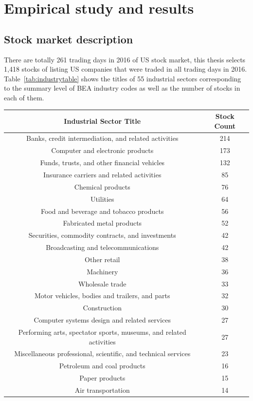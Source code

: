\chapter{Empirical study and results}
\label{cpt:result}
\section{Stock market description}
There are totally 261 trading days in 2016 of US stock market, this thesis selects 1,418 stocks of listing US companies that were traded in all trading days in 2016. Table~\ref{tab:industrytable} shows the titles of 55 industrial sectors corresponding to the summary level of BEA industry codes as well as the number of stocks in each of them.
\begin{longtable}{c|c} 
	\centering
	\textbf{Industrial Sector Title} & \textbf{Stock Count}  \\ \hline
	Banks, credit intermediation, and related activities & 214 \\ 
	Computer and electronic products & 173 \\
	Funds, trusts, and other financial vehicles	& 132\\
	Insurance carriers and related activities & 85 \\
	Chemical products & 76 \\
	Utilities & 64 \\
	Food and beverage and tobacco products	& 56 \\
	Fabricated metal products & 52 \\
	Securities, commodity contracts, and investments & 42 \\
	Broadcasting and telecommunications	& 42 \\
	Other retail & 38 \\
	Machinery&	36 \\
	Wholesale trade & 33 \\
	Motor vehicles, bodies and trailers, and parts & 32 \\
	Construction & 30 \\
	Computer systems design and related services & 27 \\
	Performing arts, spectator sports, museums, and related activities & 27 \\
	Miscellaneous professional, scientific, and technical services & 23 \\
	Petroleum and coal products & 16 \\
	Paper products & 15 \\
	Air transportation & 14 \\

\end{longtable}
